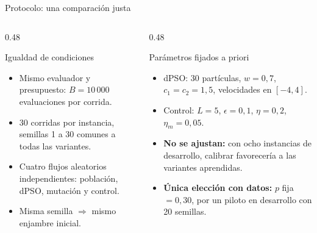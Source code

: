 \documentclass[aspectratio=169,11pt]{beamer}
\newcommand{\dc}{{,}}%
\begin{document}
\begin{frame}{Protocolo: una comparación justa}
  \begin{columns}[t]
    \begin{column}{0.48\textwidth}
      \begin{block}{Igualdad de condiciones}
        \small
        \begin{itemize}
          \item Mismo evaluador y presupuesto: $B=10\,000$ evaluaciones por corrida.
          \item 30 corridas por instancia, semillas 1 a 30 comunes a todas las variantes.
          \item Cuatro flujos aleatorios independientes: población, dPSO, mutación y control.
          \item Misma semilla $\Rightarrow$ mismo enjambre inicial.
        \end{itemize}
      \end{block}
    \end{column}

    \begin{column}{0.48\textwidth}
      \begin{block}{Parámetros fijados a priori}
        \small
        \begin{itemize}
          \item dPSO: 30 partículas, $w=0\dc7$, $c_1=c_2=1\dc5$, velocidades en $[-4,4]$.
          \item Control: $L=5$, $\epsilon=0\dc1$, $\eta=0\dc2$, $\eta_m=0\dc05$.
          \item \textbf{No se ajustan:} con ocho instancias de desarrollo, calibrar favorecería a las variantes aprendidas.
          \item \textbf{Única elección con datos:} $p$ fija $=0\dc30$, por un piloto en desarrollo con 20 semillas.
        \end{itemize}
      \end{block}
    \end{column}
  \end{columns}

\end{frame}
\end{document}
